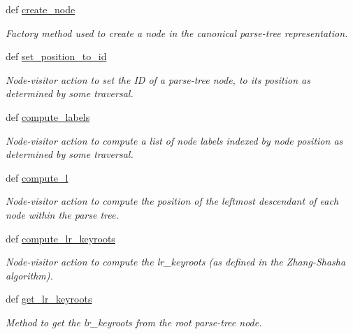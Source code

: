 \begin{DoxyCompactItemize}
\item 
def \hyperlink{classxutools_1_1distances_1_1_zhang_shasha_tree_dist_aaebe4170d96974bbb7886d47e945155b}{create\-\_\-node}
\begin{DoxyCompactList}\small\item\em Factory method used to create a node in the canonical parse-\/tree representation. \end{DoxyCompactList}\item 
def \hyperlink{classxutools_1_1distances_1_1_zhang_shasha_tree_dist_a2da4b924eb6df43476c4294480403036}{set\-\_\-position\-\_\-to\-\_\-id}
\begin{DoxyCompactList}\small\item\em Node-\/visitor action to set the I\-D of a parse-\/tree node, to its position as determined by some traversal. \end{DoxyCompactList}\item 
def \hyperlink{classxutools_1_1distances_1_1_zhang_shasha_tree_dist_a461fef31caf7ae9d4b80feb739aeb762}{compute\-\_\-labels}
\begin{DoxyCompactList}\small\item\em Node-\/visitor action to compute a list of node labels indexed by node position as determined by some traversal. \end{DoxyCompactList}\item 
def \hyperlink{classxutools_1_1distances_1_1_zhang_shasha_tree_dist_a34effff9b635661b8682c34de0d8d838}{compute\-\_\-l}
\begin{DoxyCompactList}\small\item\em Node-\/visitor action to compute the position of the leftmost descendant of each node within the parse tree. \end{DoxyCompactList}\item 
def \hyperlink{classxutools_1_1distances_1_1_zhang_shasha_tree_dist_a67818415c43fd9ffabc973edab2ace16}{compute\-\_\-lr\-\_\-keyroots}
\begin{DoxyCompactList}\small\item\em Node-\/visitor action to compute the lr\-\_\-keyroots (as defined in the Zhang-\/\-Shasha algorithm). \end{DoxyCompactList}\item 
def \hyperlink{classxutools_1_1distances_1_1_zhang_shasha_tree_dist_a3ccf16e1cbcde6ff2bb44f5ba591d5cf}{get\-\_\-lr\-\_\-keyroots}
\begin{DoxyCompactList}\small\item\em Method to get the lr\-\_\-keyroots from the root parse-\/tree node. \end{DoxyCompactList}\item 

\end{DoxyCompactItemize}
